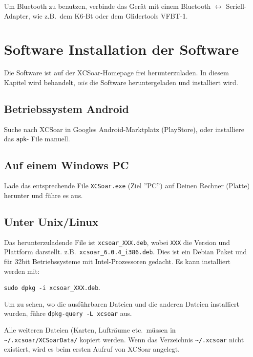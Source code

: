 Um Bluetooth zu benutzen, verbinde das Gerät mit einem Bluetooth $\leftrightarrow$ Seriell-Adapter, wie z.B.\ 
 dem K6-Bt oder dem Glidertools VFBT-1.


\section{Software Installation der Software}

Die Software ist auf der {\textsf  XCSoar}-Homepage frei herunterzuladen. 
In diesem Kapitel wird behandelt, {\sl wie} die Software heruntergeladen und installiert wird.

\subsection*{Betriebssystem Android}

Suche nach {\textsf  XCSoar} in Googles Android-Marktplatz (PlayStore), oder installiere das \verb|apk|-
File manuell.

\subsection*{Auf einem Windows PC}
  
Lade das entsprechende File \verb|XCSoar.exe| (Ziel ''PC'') auf Deinen Rechner (Platte) herunter und führe es aus.


\subsection*{Unter Unix/Linux}

Das herunterzuladende File ist \verb|xcsoar_XXX.deb|, wobei \verb|XXX| die Version und Plattform darstellt.  
z.B.\ \verb|xcsoar_6.0.4_i386.deb|. Dies ist ein Debian Paket und für 32bit Betriebssysteme mit Intel-Prozessoren gedacht.
Es kann installiert werden mit:
\begin{center}
\verb|sudo dpkg -i xcsoar_XXX.deb|.
\end{center}
Um zu sehen, wo die ausführbaren Dateien und die anderen Dateien installiert wurden, führe \verb|dpkg-query -L xcsoar| 
aus. 

Alle weiteren Dateien (Karten, Lufträume etc.\ müssen in \verb|~/.xcsoar/XCSoarData/| kopiert werden.
Wenn das Verzeichnis \verb|~/.xcsoar| nicht existiert, wird es beim ersten Aufruf von {\textsf  XCSoar} angelegt.


